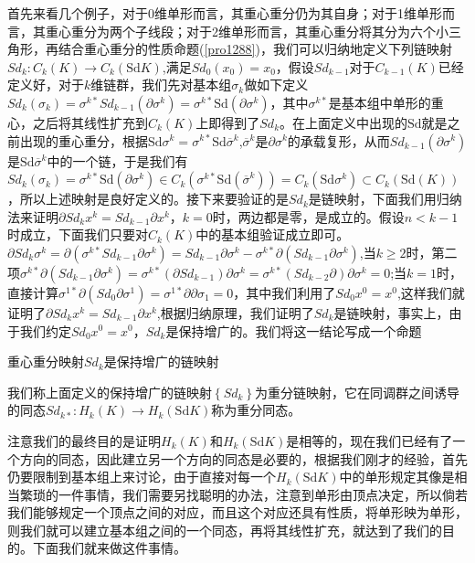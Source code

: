 首先来看几个例子，对于0维单形而言，其重心重分仍为其自身；对于1维单形而言，其重心重分为两个子线段；对于2维单形而言，其重心重分将其分为六个小三角形，再结合重心重分的性质命题(\ref{pro1288})，我们可以归纳地定义下列链映射$Sd_{k}:C_{k}(K)\rightarrow C_{k}(\text{Sd}K)$,满足$Sd_{0}(x_{0})=x_{0}$，假设$Sd_{k-1}$对于$C_{k-1}(K)$已经定义好，对于$k$维链群，我们先对基本组$\sigma_{k}$做如下定义$Sd_{k}(\sigma_{k})=\sigma^{k*}Sd_{k-1}(\partial\sigma^{k})=\sigma^{k*}\text{Sd}(\partial\sigma^{k})$，其中$\sigma^{k*}$是基本组中单形的重心，之后将其线性扩充到$C_{k}(K)$上即得到了$Sd_{k}$。在上面定义中出现的$\text{Sd}$就是之前出现的重心重分，根据$\text{Sd}\sigma^{k}=\sigma^{k*}\text{Sd}\overline{\sigma}^{k}$,$\overline{\sigma}^{k}$是$\partial\sigma^{k}$的承载复形，从而$Sd_{k-1}(\partial\sigma^{k})$是$\text{Sd}\overline{\sigma}^{k}$中的一个链，于是我们有$Sd_{k}(\sigma_{k})=\sigma^{k*}\text{Sd}(\partial\sigma^{k})\in C_{k}(\sigma^{k*}\text{Sd}(\overline{\sigma}^{k}))=C_{k}(\text{Sd}\sigma^{k})\subset C_{k}(\text{Sd}(K))$，所以上述映射是良好定义的。接下来要验证的是$Sd_{k}$是链映射，下面我们用归纳法来证明$\partial Sd_{k}x^{k}=Sd_{k-1}\partial x^{k}$，$k=0$时，两边都是零，是成立的。假设$n<k-1$时成立，下面我们只要对$C_{k}(K)$中的基本组验证成立即可。$\partial Sd_{k}\sigma^{k}=\partial(\sigma^{k*}Sd_{k-1}\partial\sigma^{k})=Sd_{k-1}\partial\sigma^{k}-\sigma^{k*}\partial(Sd_{k-1}\partial\sigma^{k})$,当$k\geq 2$时，第二项$\sigma^{k*}\partial(Sd_{k-1}\partial\sigma^{k})=\sigma^{k*}(\partial Sd_{k-1})\partial\sigma^{k}=\sigma^{k*}(Sd_{k-2}\partial)\partial\sigma^{k}=0$;当$k=1$时，直接计算$\sigma^{1*}\partial(Sd_{0}\partial\sigma^{1})=\sigma^{1*}\partial\partial\sigma_{1}=0$，其中我们利用了$Sd_{0}x^{0}=x^{0}$,这样我们就证明了$\partial Sd_{k}x^{k}=Sd_{k-1}\partial x^{k}$,根据归纳原理，我们证明了$Sd_{k}$是链映射，事实上，由于我们约定$Sd_{0}x^{0}=x^{0}$，$Sd_{k}$是保持增广的。我们将这一结论写成一个命题
\begin{proposition}\label{chap1_pro_1526}
重心重分映射$Sd_{k}$是保持增广的链映射
\end{proposition}
\begin{definition}
我们称上面定义的保持增广的链映射$\left\{Sd_{k}\right\}$为重分链映射，它在同调群之间诱导的同态$Sd_{k*}:H_{k}(K)\rightarrow H_{k}(\text{Sd}K)$称为重分同态。
\end{definition}
注意我们的最终目的是证明$H_{k}(K)$和$H_{k}(\text{Sd}K)$是相等的，现在我们已经有了一个方向的同态，因此建立另一个方向的同态是必要的，根据我们刚才的经验，首先仍要限制到基本组上来讨论，由于直接对每一个$H_{k}(\text{Sd}K)$中的单形规定其像是相当繁琐的一件事情，我们需要另找聪明的办法，注意到单形由顶点决定，所以倘若我们能够规定一个顶点之间的对应，而且这个对应还具有性质，将单形映为单形，则我们就可以建立基本组之间的一个同态，再将其线性扩充，就达到了我们的目的。下面我们就来做这件事情。
